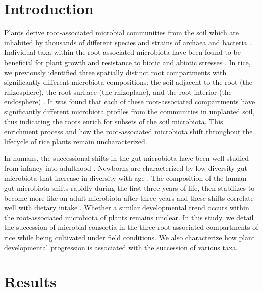 \section{Introduction}
Plants derive root-associated microbial communities from the soil which are inhabited by thousands of different species and strains of archaea and bacteria \cite{Lundberg2012,Bulgarelli2012,Peiffer2013,Edwards2015,Wagner2016}. Individual taxa within the root-associated microbiota have been found to be beneficial for plant growth and resistance to biotic and abiotic stresses \cite{Bulgarelli2013,Berendsen2012,Mendes2011}. In rice, we previously identified three spatially distinct root compartments with significantly different microbiota compositions: the soil adjacent to the root (the rhizosphere), the root surf,ace (the rhizoplane), and the root interior (the endosphere) \cite{Edwards2015}. It was found that each of these root-associated compartments have significantly different microbiota profiles from the communities in unplanted soil, thus indicating the roots enrich for subsets of the soil microbiota. This enrichment process and how the root-associated microbiota shift throughout the lifecycle of rice plants remain uncharacterized.

In humans, the successional shifts in the gut microbiota have been well studied from infancy into adulthood \cite{Koenig2011,Mueller2015,Backhed2015,Yatsunenko2012}. Newborns are characterized by low diversity gut microbiota that increase in diversity with age \cite{Koenig2011}. The composition of the human gut microbiota shifts rapidly during the first three years of life, then stabilizes to become more like an adult microbiota after three years and these shifts correlate well with dietary intake \cite{Yatsunenko2012}. Whether a similar developmental  trend occurs within the root-associated microbiota of plants remains unclear. In this study, we detail the succession of microbial consortia in the three root-associated compartments of rice while being cultivated under field conditions. We also characterize how plant developmental progression is associated with the succession of various taxa.

\section{Results}
